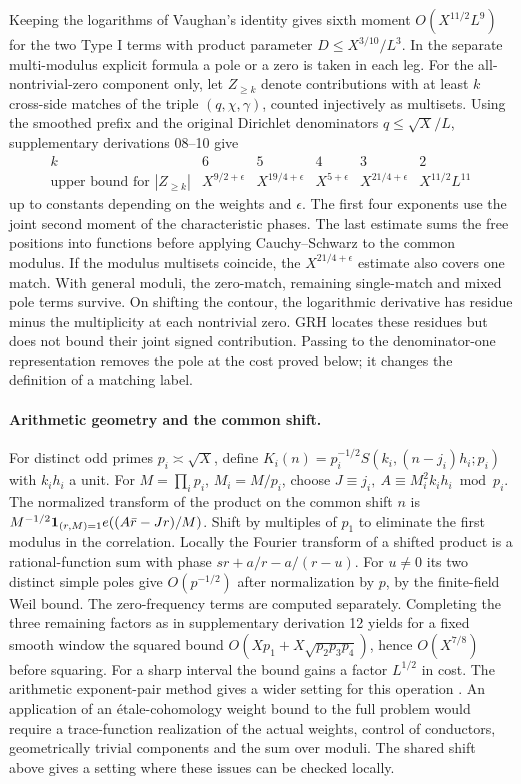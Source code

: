 \documentclass[11pt,a4paper]{article}
\begin{document}
Keeping the logarithms of Vaughan's identity gives sixth moment \(O(X^{11/2}L^9)\) for the two Type I terms with product parameter \(D\le X^{3/10}/L^3\). In the separate multi-modulus explicit formula a pole or a zero is taken in each leg. For the all-nontrivial-zero component only, let \(Z_{\ge k}\) denote contributions with at least \(k\) cross-side matches of the triple \((q,\chi,\gamma)\), counted injectively as multisets. Using the smoothed prefix and the original Dirichlet denominators \(q\le\sqrt X/L\), supplementary derivations 08--10 give
\[
\begin{array}{c|ccccc}
k&6&5&4&3&2\\ \hline
\text{upper bound for }|Z_{\ge k}|&
X^{9/2+\epsilon}&X^{19/4+\epsilon}&X^{5+\epsilon}&X^{21/4+\epsilon}&X^{11/2}L^{11}
\end{array}
\]
up to constants depending on the weights and \(\epsilon\). The first four exponents use the joint second moment of the characteristic phases. The last estimate sums the free positions into functions before applying Cauchy--Schwarz to the common modulus. If the modulus multisets coincide, the \(X^{21/4+\epsilon}\) estimate also covers one match. With general moduli, the zero-match, remaining single-match and mixed pole terms survive. On shifting the contour, the logarithmic derivative has residue minus the multiplicity at each nontrivial zero. GRH locates these residues but does not bound their joint signed contribution. Passing to the denominator-one representation removes the pole at the cost proved below; it changes the definition of a matching label.

\paragraph{Arithmetic geometry and the common shift.}
For distinct odd primes \(p_i\asymp\sqrt X\), define \(K_i(n)=p_i^{-1/2}S(k_i,(n-j_i)h_i;p_i)\) with \(k_i h_i\) a unit. For \(M=\prod_i p_i\), \(M_i=M/p_i\), choose \(J\equiv j_i,\ A\equiv M_i^2 k_i h_i\bmod p_i\). The normalized transform of the product on the common shift \(n\) is \(M^{-1/2}\mathbf1_{(r,M)=1}e((A\bar r-Jr)/M)\). Shift by multiples of \(p_1\) to eliminate the first modulus in the correlation. Locally the Fourier transform of a shifted product is a rational-function sum with phase \(sr+a/r-a/(r-u)\). For \(u\ne0\) its two distinct simple poles give \(O(p^{-1/2})\) after normalization by \(p\), by the finite-field Weil bound. The zero-frequency terms are computed separately. Completing the three remaining factors as in supplementary derivation 12 yields for a fixed smooth window the squared bound \(O(Xp_1+X\sqrt{p_2p_3p_4})\), hence \(O(X^{7/8})\) before squaring. For a sharp interval the bound gains a factor \(L^{1/2}\) in cost. The arithmetic exponent-pair method gives a wider setting for this operation \cite{WX}. An application of an étale-cohomology weight bound to the full problem would require a trace-function realization of the actual weights, control of conductors, geometrically trivial components and the sum over moduli. The shared shift above gives a setting where these issues can be checked locally.
\end{document}
